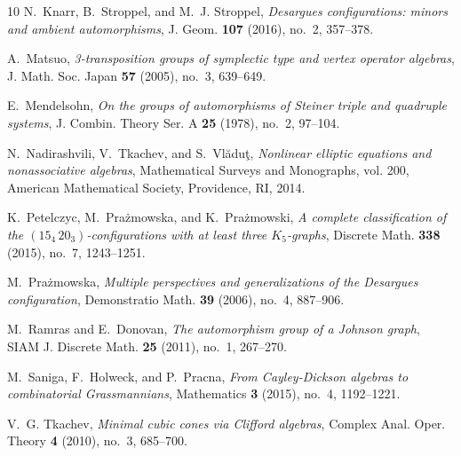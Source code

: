 \documentclass[times,11pt,reqno]{amsproc}
\theoremstyle{definition}
\numberwithin{equation}{section}
\begin{document}
\begin{thebibliography}{10}
N.~Knarr, B.~Stroppel, and M.~J. Stroppel, \emph{Desargues configurations:
  minors and ambient automorphisms}, J. Geom. \textbf{107} (2016), no.~2,
  357--378.

A.~Matsuo, \emph{3-transposition groups of symplectic type and vertex operator
  algebras}, J. Math. Soc. Japan \textbf{57} (2005), no.~3, 639--649.

E.~Mendelsohn, \emph{On the groups of automorphisms of {S}teiner triple and
  quadruple systems}, J. Combin. Theory Ser. A \textbf{25} (1978), no.~2,
  97--104.

N.~Nadirashvili, V.~Tkachev, and S.~Vl\u{a}du\c{t}, \emph{Nonlinear elliptic
  equations and nonassociative algebras}, Mathematical Surveys and Monographs,
  vol. 200, American Mathematical Society, Providence, RI, 2014.

K.~Petelczyc, M.~Pra{\.z}mowska, and K.~Pra{\.z}mowski, \emph{A complete
  classification of the {$(15_4\,20_3)$}-configurations with at least three
  {$K_5$}-graphs}, Discrete Math. \textbf{338} (2015), no.~7, 1243--1251.

M.~Pra{\.z}mowska, \emph{Multiple perspectives and generalizations of the
  {D}esargues configuration}, Demonstratio Math. \textbf{39} (2006), no.~4,
  887--906.

M.~Ramras and E.~Donovan, \emph{The automorphism group of a {J}ohnson graph},
  SIAM J. Discrete Math. \textbf{25} (2011), no.~1, 267--270.

M.~Saniga, F.~Holweck, and P.~Pracna, \emph{From {C}ayley-{D}ickson algebras to
  combinatorial {G}rassmannians}, Mathematics \textbf{3} (2015), no.~4,
  1192--1221.

V.~G. Tkachev, \emph{Minimal cubic cones via {C}lifford algebras}, Complex
  Anal. Oper. Theory \textbf{4} (2010), no.~3, 685--700.

\end{thebibliography}
\end{document}

